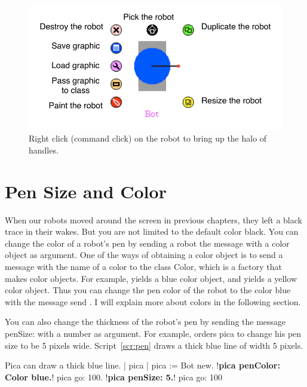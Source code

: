 \documentclass[a4paper,10pt,twoside]{book}
\begin{document}
\begin{figure}[h]
	\centerline{\includegraphics{picaAllHaloAnnotated}}
	\caption{Right click (command click) on the robot to bring up the halo of handles. \label{fig:halos}}
\end{figure}


\section{Pen Size and Color}

When our robots moved around the screen in previous chapters, they left a black trace in their 
wakes. But you are not limited to the default color black. You can change the color of a robot’s 
pen by sending a robot the message  with a color object as argument. One of the 
ways of obtaining a color object is to send a message with the name of a color to the class 
Color, which is a factory that makes color objects. For example,  yields a blue color 
object, and  yields a yellow color object. Thus you can change the pen color of 
the robot  to the color blue with the message send . I will 
explain more about colors in the following section. 

You can also change the thickness of the robot’s pen by sending the message penSize: 
with a number as argument. For example,  orders pica to change his pen size 
to be 5 pixels wide. Script~\ref{scr:pen} draws a thick blue line of width 5 pixels. 


\begin{script}[pen]{Pica can draw a thick blue line.}
| pica | 
pica := Bot new. 
!\textbf{pica penColor: Color blue.}!
pica go: 100. 
!\textbf{pica penSize: 5.}!
pica go: 100 
\end{script}
\end{document}
